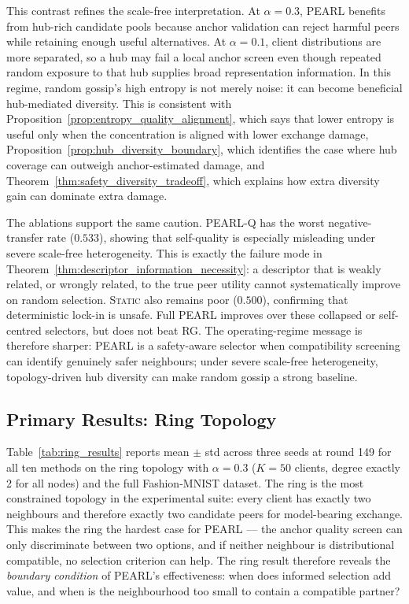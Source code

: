 \documentclass[conference]{IEEEtran}
\begin{document}
This contrast refines the scale-free interpretation. At $\alpha=0.3$, \textsc{PEARL} benefits from hub-rich candidate pools because anchor validation can reject harmful peers while retaining enough useful alternatives. At $\alpha=0.1$, client distributions are more separated, so a hub may fail a local anchor screen even though repeated random exposure to that hub supplies broad representation information. In this regime, random gossip's high entropy is not merely noise: it can become beneficial hub-mediated diversity. This is consistent with Proposition~\ref{prop:entropy_quality_alignment}, which says that lower entropy is useful only when the concentration is aligned with lower exchange damage, Proposition~\ref{prop:hub_diversity_boundary}, which identifies the case where hub coverage can outweigh anchor-estimated damage, and Theorem~\ref{thm:safety_diversity_tradeoff}, which explains how extra diversity gain can dominate extra damage.

The ablations support the same caution. \textsc{PEARL-Q} has the worst negative-transfer rate ($0.533$), showing that self-quality is especially misleading under severe scale-free heterogeneity. This is exactly the failure mode in Theorem~\ref{thm:descriptor_information_necessity}: a descriptor that is weakly related, or wrongly related, to the true peer utility cannot systematically improve on random selection. \textsc{Static} also remains poor ($0.500$), confirming that deterministic lock-in is unsafe. Full \textsc{PEARL} improves over these collapsed or self-centred selectors, but does not beat \textsc{RG}. The operating-regime message is therefore sharper: PEARL is a safety-aware selector when compatibility screening can identify genuinely safer neighbours; under severe scale-free heterogeneity, topology-driven hub diversity can make random gossip a strong baseline.

\subsection{Primary Results: Ring Topology}
\label{subsec:results-ring}

Table~\ref{tab:ring_results} reports mean $\pm$ std across three seeds at round 149 for all ten methods on the ring topology with $\alpha=0.3$ ($K=50$ clients, degree exactly 2 for all nodes) and the full Fashion-MNIST dataset. The ring is the most constrained topology in the experimental suite: every client has exactly two neighbours and therefore exactly two candidate peers for model-bearing exchange. This makes the ring the hardest case for PEARL --- the anchor quality screen can only discriminate between two options, and if neither neighbour is distributional compatible, no selection criterion can help. The ring result therefore reveals the \emph{boundary condition} of PEARL's effectiveness: when does informed selection add value, and when is the neighbourhood too small to contain a compatible partner?
\end{document}
